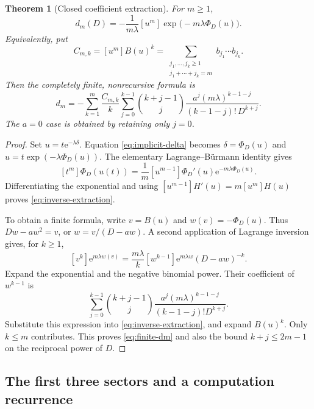 \documentclass[11pt]{article}
\numberwithin{equation}{section}
\newtheorem{theorem}{Theorem}[section]
\theoremstyle{definition}
\newcommand{\coef}[2]{[#1^{#2}]}
\newcommand{\ee}{\mathrm e}
\begin{document}
\begin{theorem}[Closed coefficient extraction]\label{thm:coefficient}
For $m\ge1$,
\begin{equation}\label{eq:inverse-extraction}
 \boxed{\displaystyle
 d_m(D)=-\frac1{m\lambda}\coef{u}{m}
          \exp\bigl(-m\lambda\Phi_D(u)\bigr).}
\end{equation}
Equivalently, put
\begin{equation}\label{eq:Cmk}
 C_{m,k}=\coef{u}{m}B(u)^k
 =\sum_{\substack{j_1,\ldots,j_k\ge1\\j_1+\cdots+j_k=m}}
       b_{j_1}\cdots b_{j_k}.
\end{equation}
Then the completely finite, nonrecursive formula is
\begin{equation}\label{eq:finite-dm}
 \boxed{\displaystyle
 d_m=-\sum_{k=1}^m\frac{C_{m,k}}{k}
 \sum_{j=0}^{k-1}\binom{k+j-1}{j}
 \frac{a^j(m\lambda)^{k-1-j}}
 {(k-1-j)!\,D^{k+j}}.}
\end{equation}
The $a=0$ case is obtained by retaining only $j=0$.
\end{theorem}

\begin{proof}
Set $u=t\ee^{-\lambda\delta}$. Equation \eqref{eq:implicit-delta} becomes
$\delta=\Phi_D(u)$ and $u=t\exp(-\lambda\Phi_D(u))$.
The elementary Lagrange--B\"urmann identity gives
\[
 [t^m]\Phi_D(u(t))
 =\frac1m[u^{m-1}]\Phi_D'(u)\ee^{-m\lambda\Phi_D(u)}.
\]
Differentiating the exponential and using
$[u^{m-1}]H'(u)=m[u^m]H(u)$ proves \eqref{eq:inverse-extraction}.

To obtain a finite formula, write $v=B(u)$ and
$w(v)=-\Phi_D(u)$. Thus $Dw-aw^2=v$, or
$w=v/(D-aw)$. A second application of Lagrange inversion gives, for $k\ge1$,
\[
 [v^k]\ee^{m\lambda w(v)}
 =\frac{m\lambda}{k}[w^{k-1}]
      \ee^{m\lambda w}(D-aw)^{-k}.
\]
Expand the exponential and the negative binomial power. Their coefficient of $w^{k-1}$ is
\[
 \sum_{j=0}^{k-1}\binom{k+j-1}{j}
 \frac{a^j(m\lambda)^{k-1-j}}{(k-1-j)!D^{k+j}}.
\]
Substitute this expression into \eqref{eq:inverse-extraction}, and expand $B(u)^k$. Only $k\le m$ contributes. This proves \eqref{eq:finite-dm} and also the bound $k+j\le2m-1$ on the reciprocal power of $D$.
\end{proof}

\subsection{The first three sectors and a computation recurrence}
\end{document}

